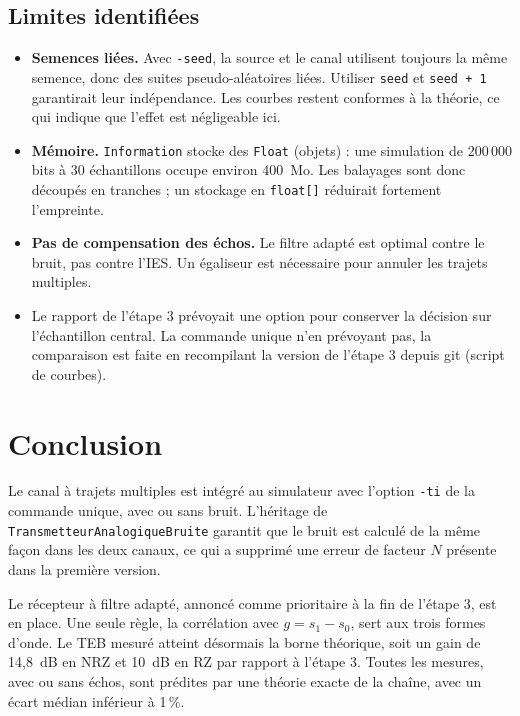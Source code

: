 \documentclass[11pt,a4paper]{article}
\newcommand{\cls}[1]{\texttt{#1}}
\begin{document}
\subsection{Limites identifiées}
\begin{itemize}
  \item \textbf{Semences liées.} Avec \texttt{-seed}, la source et le canal utilisent toujours la même semence, donc des suites pseudo-aléatoires liées. Utiliser \texttt{seed} et \texttt{seed + 1} garantirait leur indépendance. Les courbes restent conformes à la théorie, ce qui indique que l'effet est négligeable ici.
  \item \textbf{Mémoire.} \cls{Information} stocke des \texttt{Float} (objets) : une simulation de 200\,000 bits à 30 échantillons occupe environ 400~Mo. Les balayages sont donc découpés en tranches ; un stockage en \texttt{float[]} réduirait fortement l'empreinte.
  \item \textbf{Pas de compensation des échos.} Le filtre adapté est optimal contre le bruit, pas contre l'IES. Un égaliseur est nécessaire pour annuler les trajets multiples.
  \item Le rapport de l'étape 3 prévoyait une option pour conserver la décision sur l'échantillon central. La commande unique n'en prévoyant pas, la comparaison est faite en recompilant la version de l'étape 3 depuis git (script de courbes).
\end{itemize}

\section{Conclusion}
Le canal à trajets multiples est intégré au simulateur avec l'option \texttt{-ti} de la commande unique, avec ou sans bruit. L'héritage de \cls{TransmetteurAnalogiqueBruite} garantit que le bruit est calculé de la même façon dans les deux canaux, ce qui a supprimé une erreur de facteur $N$ présente dans la première version.

Le récepteur à filtre adapté, annoncé comme prioritaire à la fin de l'étape 3, est en place. Une seule règle, la corrélation avec $g = s_1 - s_0$, sert aux trois formes d'onde. Le TEB mesuré atteint désormais la borne théorique, soit un gain de 14,8~dB en NRZ et 10~dB en RZ par rapport à l'étape 3. Toutes les mesures, avec ou sans échos, sont prédites par une théorie exacte de la chaîne, avec un écart médian inférieur à 1\,\%.
\end{document}
